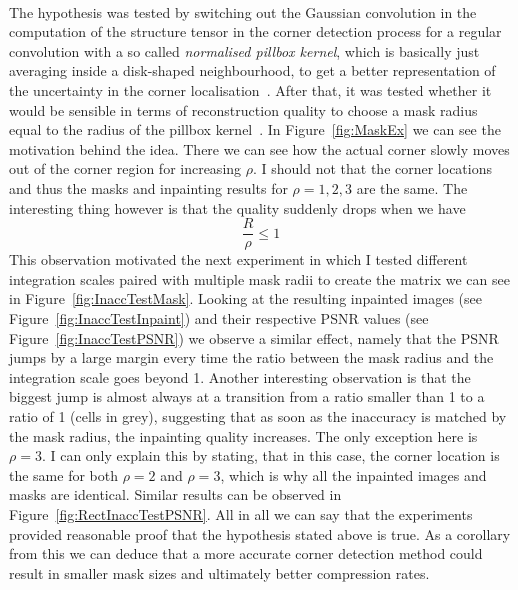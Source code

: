 \\ \noindent The hypothesis was tested by switching out the Gaussian
convolution in the computation of the structure tensor in the corner detection process for a
regular convolution with a so called \textit{normalised pillbox kernel}, which is basically just
averaging inside a disk-shaped neighbourhood, to get a better representation of the uncertainty in
the corner localisation~\cite{conversation}. After that, it was tested whether it would be
sensible in terms of reconstruction quality to choose a mask radius equal to the radius of the
pillbox kernel~\cite{conversation}. 
In Figure~\ref{fig:MaskEx} we can see the motivation behind the
idea. There we can see how the actual corner slowly moves out of the corner region for increasing
$\rho$. I should not that the corner locations and thus the masks and inpainting results for
$\rho=1,2,3$ are the same. The interesting thing however is that the quality suddenly drops when we 
have 
\begin{equation}
    \frac{R}{\rho}\leq1
\end{equation}
This observation motivated the next experiment in which I tested different integration scales
paired with multiple mask radii to create the matrix we can see in Figure~\ref{fig:InaccTestMask}.
Looking at the resulting inpainted images (see Figure~\ref{fig:InaccTestInpaint}) and their
respective PSNR values (see Figure~\ref{fig:InaccTestPSNR}) we observe a similar effect, namely
that the PSNR jumps by a large margin every time the ratio between the mask radius and the
integration scale goes beyond 1.\newpage\noindent
Another interesting observation is that the biggest jump is almost
always at a transition from a ratio smaller than 1 to a ratio of 1 (cells in grey), suggesting that
as soon as the inaccuracy is matched by the mask radius, the inpainting quality increases. The only
exception here is $\rho=3$. I can only explain this by stating, that in this case, the corner
location is the same for both $\rho=2$ and $\rho=3$, which is why all the inpainted images and
masks are identical. Similar results can be observed in
Figure~\ref{fig:RectInaccTestPSNR}.\newpage\noindent
All in all we can say that the experiments provided reasonable proof that the hypothesis stated
above is true. As a corollary from this we can deduce that a more accurate corner detection method
could result in smaller mask sizes and ultimately better compression rates.
